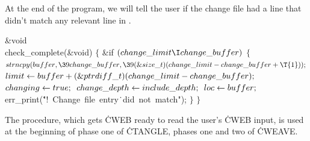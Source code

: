 At the end of the program, we will tell the user if the change file
had a line that didn't match any relevant line in .

\Y\B\1\1\&{void} \\{check\_complete}(\&{void})\2\2\6
${}\{{}$\1\6
\&{if} ${}(\\{change\_limit}\I\\{change\_buffer}){}$\5
${}\{{}$\1\6
${}\\{strncpy}(\\{buffer},\39\\{change\_buffer},\39(\&{size\_t})(\\{change%
\_limit}-\\{change\_buffer}+\T{1}));{}$\6
${}\\{limit}\K\\{buffer}+(\&{ptrdiff\_t})(\\{change\_limit}-\\{change%
\_buffer});{}$\6
${}\\{changing}\leftarrow\\{true};{}$\6
${}\\{change\_depth}\leftarrow\\{include\_depth};{}$\6
${}\\{loc}\leftarrow\\{buffer};{}$\6
\\{err\_print}(\.{"!\ Change\ file\ entry}\)\.{\ did\ not\ match"});\6
\4${}\}{}$\2\6
\4${}\}{}$\2\par
\fi

The  procedure, which gets \.{CWEB} ready to read
the
user's \.{CWEB} input, is used at the beginning of phase one of \.{CTANGLE},
phases one and two of \.{CWEAVE}.

